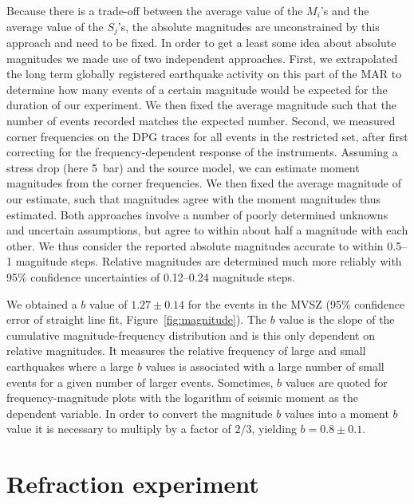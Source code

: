 \documentclass[jgr]{aguplus}
\newlength{\tw}
\begin{document}
\begin{article}
Because there is a trade-off between the average
value of the $M_i$'s and the average value of the $S_j$'s, the absolute
magnitudes are unconstrained by this approach and need to be fixed.
In order to get a least some idea about absolute magnitudes we made
use of two independent
approaches. First, we extrapolated the long term globally registered earthquake activity on this
part of the MAR to determine how many events of a certain magnitude
would be expected for the duration of our experiment. We then fixed the
average magnitude such that the number of events recorded matches the
expected number.  Second, we measured corner frequencies on the DPG
traces for all
events in the restricted set, after first correcting for the
frequency-dependent response of the instruments. Assuming a stress drop (here 5~bar) and the
\citet{brune70} source model, we can estimate moment
magnitudes from the corner frequencies. We then fixed the average magnitude of our estimate, such
that magnitudes agree with the moment magnitudes thus estimated.
Both approaches involve a number of poorly determined unknowns and
uncertain assumptions, but agree to within about half a magnitude with
each other.  We thus consider the reported absolute magnitudes
accurate to within 0.5--1 magnitude steps.  Relative magnitudes are
determined much more reliably with 95\% confidence uncertainties
of 0.12--0.24 magnitude steps.

We obtained a $b$ value of  $1.27\pm0.14$ for the events in the MVSZ (95\%
confidence error of straight line fit, Figure~\ref{fig:magnitude}).
The $b$ value is the slope of
the cumulative magnitude-frequency distribution and is this only
dependent on relative magnitudes. It measures the
relative frequency of large and small earthquakes where a large $b$
values is associated with a large number of small events for a given
number of larger events.
Sometimes, $b$ values are quoted for frequency-magnitude  plots with
 the logarithm of seismic moment as the dependent variable. In order to convert the magnitude $b$ values into a
 moment $b$ value it is necessary to multiply by a factor of $2/3$,
yielding $b=0.8\pm0.1$.

\section{Refraction experiment}


\end{article}
\end{document}

